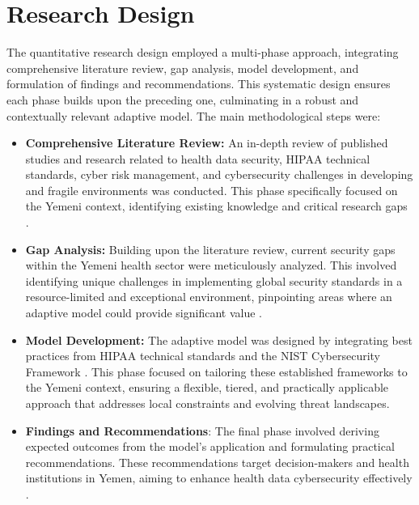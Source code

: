 \documentclass[12pt, a4paper, oneside]{report}
\begin{document}
	\section{Research Design}
	The quantitative research design employed a multi-phase approach, integrating comprehensive literature review, gap analysis, model development, and formulation of findings and recommendations. This systematic design ensures each phase builds upon the preceding one, culminating in a robust and contextually relevant adaptive model. The main methodological steps were:
	\begin{itemize}
		\item \textbf{Comprehensive Literature Review:} An in-depth review of published studies and research related to health data security, HIPAA technical standards, cyber risk management, and cybersecurity challenges in developing and fragile environments was conducted. This phase specifically focused on the Yemeni context, identifying existing knowledge and critical research gaps \cite{alhammadi2024advancing} \cite{al2025political} \cite{abdulrab2021assessing} \cite{al2023information} \cite{melaku2023context} \cite{nist2024sp80066r2} \cite{hasegawa2024cybersecurity} \cite{saad2025fuzzy}.
		\item \textbf{Gap Analysis:} Building upon the literature review, current security gaps within the Yemeni health sector were meticulously analyzed. This involved identifying unique challenges in implementing global security standards in a resource-limited and exceptional environment, pinpointing areas where an adaptive model could provide significant value \cite{abdulrab2021assessing} \cite{al2023information}.
		\item \textbf{Model Development:} The adaptive model was designed by integrating best practices from HIPAA technical standards and the NIST Cybersecurity Framework \cite{hhs2024hipaa} \cite{rahmany2026aida}. This phase focused on tailoring these established frameworks to the Yemeni context, ensuring a flexible, tiered, and practically applicable approach that addresses local constraints and evolving threat landscapes.
		\item \textbf{Findings and Recommendations}: The final phase involved deriving expected outcomes from the model’s application and formulating practical recommendations. These recommendations target decision-makers and health institutions in Yemen, aiming to enhance health data cybersecurity effectively \cite{hasegawa2024cybersecurity} \cite{saad2025fuzzy}.	
	\end{itemize}
	
\end{document}
